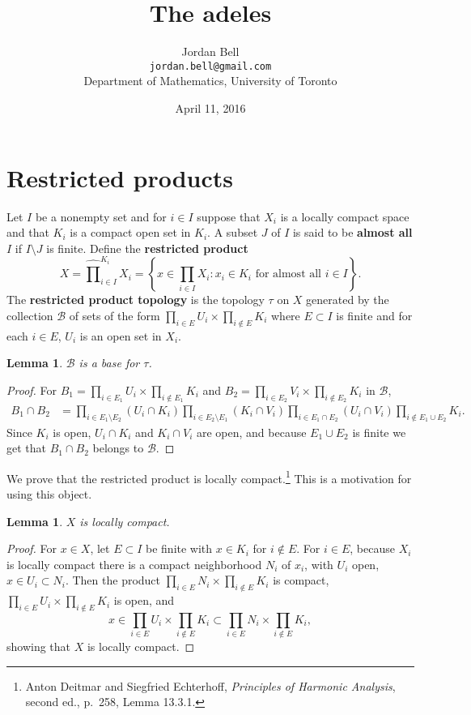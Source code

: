 \documentclass{article}
\newtheorem{lemma}[theorem]{Lemma}
\theoremstyle{definition}
\begin{document}
\title{The adeles}
\author{Jordan Bell\\ \texttt{jordan.bell@gmail.com}\\Department of Mathematics, University of Toronto}
\date{April 11, 2016}

\maketitle

\section{Restricted products}
Let $I$ be a nonempty set and for $i \in I$ suppose that 
$X_i$ is a locally compact space and that $K_i$ is a compact open set in $K_i$. 
A subset $J$ of $I$ is said to be \textbf{almost all $I$} if $I \setminus J$ is finite.
Define the \textbf{restricted product}
\[
X = \widehat{\prod}_{i \in I}^{K_i} X_i = \left\{ x \in \prod_{i \in I} X_i: \textrm{$x_i \in K_i$ for almost
all $i \in I$}\right\}.
\]
The \textbf{restricted product topology} is the topology $\tau$ on $X$ generated by the collection $\mathscr{B}$
of sets of the form
$\prod_{i \in E} U_i \times \prod_{i \not \in E} K_i$ where $E \subset I$ is finite and for each $i \in E$,
$U_i$ is an open set in $X_i$.

\begin{lemma}
$\mathscr{B}$ is a base for $\tau$.
\end{lemma}
\begin{proof}
For $B_1=\prod_{i \in E_1} U_i \times \prod_{i \not \in E_1} K_i$
and  $B_2 =\prod_{i \in E_2} V_i \times \prod_{i \not \in E_2} K_i$ in $\mathscr{B}$, 
\begin{align*}
B_1 \cap B_2 &= \prod_{i \in E_1 \setminus E_2} (U_i \cap K_i)  \prod_{i \in E_2 \setminus E_1} 
(K_i \cap V_i)
\prod_{i \in E_1 \cap E_2} (U_i \cap V_i)
\prod_{i \not \in E_1 \cup E_2} K_i.
\end{align*}
Since $K_i$ is open, $U_i \cap K_i$ and $K_i \cap V_i$ are open, and because $E_1 \cup E_2$ is finite we
get that $B_1 \cap B_2$ belongs to $\mathscr{B}$.
\end{proof}

We prove that the restricted product is locally compact.\footnote{Anton Deitmar and Siegfried Echterhoff,
{\em Principles of Harmonic Analysis}, second ed., p.~258, Lemma 13.3.1.} This is  a motivation for using this object.

\begin{lemma}
$X$ is locally compact.
\label{LCH}
\end{lemma}
\begin{proof}
For $x \in X$, let $E \subset I$ be finite with $x \in K_i$ for $i \not \in E$. For $i \in E$, 
because $X_i$ is locally compact there is a compact neighborhood $N_i$ of $x_i$, with
$U_i$ open, $x \in U_i \subset N_i$.  
Then the product $\prod_{i \in E} N_i \times \prod_{i \not \in E} K_i$ is compact,
$\prod_{i \in E} U_i \times \prod_{i \not \in E} K_i$ is open, and
\[
x \in \prod_{i \in E} U_i \times \prod_{i \not \in E} K_i \subset \prod_{i \in E} N_i \times \prod_{i \not \in E} K_i,
\]
showing that $X$ is locally compact. 
\end{proof}
\end{document}
